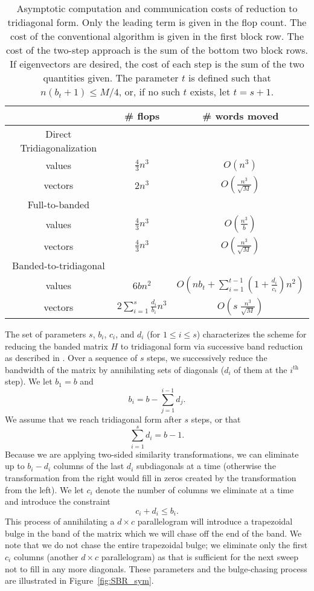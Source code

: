 \documentclass{article}
\def\lt{\left}
\def\rt{\right}
\theoremstyle{definition}
\begin{document}
\begin{table} \centering
  \begin{tabular}{| c | c | c |} \hline
  	& \# flops & \# words moved \\ \hline \hline
	Direct Tridiagonalization & & \\
	values & $\frac43 n^3$ & $O\lt(n^3\rt)$ \\
	vectors & $2n^3$ & $O\lt(\frac{n^3}{\sqrt M}\rt)$ \\ \hline \hline
	Full-to-banded & & \\
	values & $\frac43 n^3$ & $O\lt(\frac{n^3}{b}\rt)$\\
	vectors & $\frac43 n^3$ & $O\lt(\frac{n^3}{\sqrt M}\rt)$ \\ \hline 
	Banded-to-tridiagonal & & \\
	values & $6bn^2$ & $\displaystyle O\lt(nb_t + \sum_{i=1}^{t-1} \lt(1+\frac{d_i}{c_i}\rt)n^2 \rt)$ \\
	vectors & $\displaystyle 2\sum_{i=1}^s \frac{d_i}{b_i} n^3$ & $\displaystyle O\lt(s\;\frac{n^3}{\sqrt M}\rt)$ \\ \hline
  \end{tabular}
  \caption{Asymptotic computation and communication costs of reduction to tridiagonal form.  Only the leading term is given  in the flop count.  The cost of the conventional algorithm is given in the first block row.  The cost of the two-step approach is the sum of the bottom two block rows.  If eigenvectors are desired, the cost of each step is the sum of the two quantities given.  The parameter $t$ is defined such that $n(b_t+1)\leq M/4$, or, if no such $t$ exists, let $t=s+1$.}
  \label{tab:SBRcounts}
\end{table}

The set of parameters $s$, $b_i$, $c_i$, and $d_i$ (for $1\leq i\leq s$) characterizes the scheme for reducing the banded matrix $H$ to tridiagonal form via successive band reduction as described in \cite{SBR1,SBR2}.  Over a sequence of $s$ steps, we successively reduce the bandwidth of the matrix by annihilating sets of diagonals ($d_i$ of them at the $i^\text{th}$ step).  We let $b_1=b$ and 
$$b_i = b - \sum_{j=1}^{i-1} d_j.$$
We assume that we reach tridiagonal form after $s$ steps, or that 
$$\sum_{i=1}^s d_i = b-1.$$
Because we are applying two-sided similarity transformations, we can eliminate up to $b_i-d_i$ columns of the last $d_i$ subdiagonals at a time (otherwise the transformation from the right would fill in zeros created by the transformation from the left). We let $c_i$ denote the number of columns we eliminate at a time and introduce the constraint 
$$c_i+d_i \leq b_i.$$ 
This process of annihilating a $d\times c$ parallelogram will introduce a trapezoidal bulge in the band of the matrix which we will chase off the end of the band.  We note that we do not chase the entire trapezoidal bulge; we eliminate only the first $c_i$ columns (another $d\times c$ parallelogram) as that is sufficient for the next sweep not to fill in any more diagonals.  These parameters and the bulge-chasing process are illustrated in Figure~\ref{fig:SBR_sym}.
\end{document}
